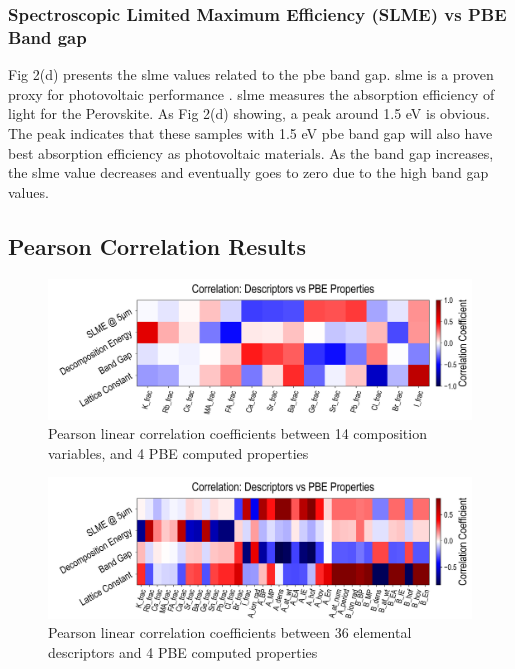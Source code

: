 \documentclass[twoside, twocolumn, 9pt, draft]{article}
\begin{document}
\subsubsection*{Spectroscopic Limited Maximum Efficiency (SLME) vs PBE Band gap}
\label{sec:org7f0e476}
Fig 2(d) presents the \gls{slme} values related to the
\acrshort{pbe} band gap. \gls{slme} is a proven proxy
for photovoltaic performance
\cite{yu-2012-ident-poten}. \gls{slme} measures the
absorption efficiency of light for the Perovskite. As Fig 2(d)
showing, a peak around 1.5 eV is obvious. The peak indicates that
these samples with 1.5 eV \acrshort{pbe} band gap will also
have best absorption efficiency as photovoltaic materials. As the band
gap increases, the \gls{slme} value decreases and eventually
goes to zero due to the high band gap values.

\subsection*{Pearson Correlation Results}
\label{sec:orgf674393}
\begin{figure}
\centering
\includegraphics[width=.9\linewidth]{./expval/PBE_v_comp_pearson2.png}
\caption{\label{fig:pearson_pcomp} Pearson linear correlation coefficients between 14 composition variables, and 4 PBE computed properties}
\end{figure}

\begin{figure}
\centering
\includegraphics[width=.9\linewidth]{./expval/PBE_v_site_prop_pearson.png}
\caption{\label{fig:pearson_psite} Pearson linear correlation coefficients between 36 elemental descriptors and 4 PBE computed properties}
\end{figure}
\end{document}
